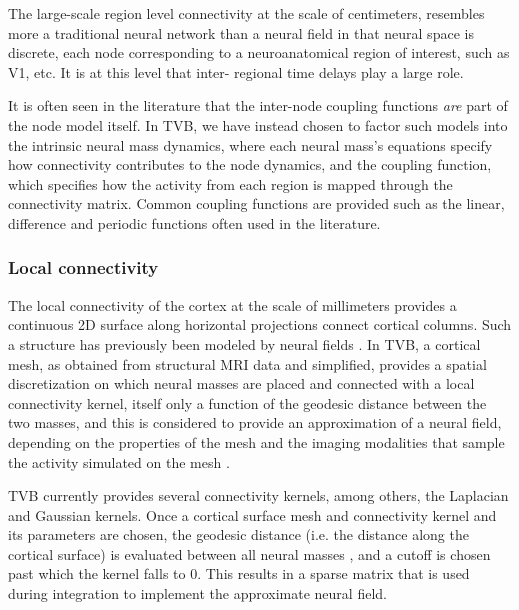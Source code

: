     The large-scale region level connectivity at the scale of centimeters,
    resembles more a traditional neural network than a neural field in that
    neural space is discrete,  each node corresponding to a neuroanatomical
    region of interest, such as V1, etc. It is at this level that inter-
    regional time delays play a large role.

	It is often seen in the literature that the inter-node coupling functions
	\textit{are} part of the node model itself. In TVB, we have instead 
	chosen to factor such models into the intrinsic neural mass dynamics, where each 
	neural mass's equations specify how connectivity contributes to the
	node dynamics, and the coupling function, which specifies how the activity
	from each region is mapped through the connectivity matrix. Common coupling 
	functions are provided such as the linear, difference and periodic functions
	often used in the literature.

	\subsubsection{Local connectivity}

	The local connectivity of the cortex at the scale of millimeters provides
	a continuous 2D surface along horizontal projections connect 
	cortical columns. Such a structure has previously been modeled by
	neural fields \cite{Amari_1977, Jirsa_1997, Liley_1999}. In TVB, a cortical mesh, 
	as obtained from structural MRI data and simplified, provides a spatial 
	discretization on which neural masses are placed and connected with a
	local connectivity kernel, itself only a function of the geodesic distance
	between the two masses, and this is considered to provide an
	approximation of a neural field, depending on the properties
	of the mesh and the imaging modalities that sample the activity simulated
	on the mesh \cite{Spiegler_2013}. 

	TVB currently provides several connectivity kernels, among others, 
	the Laplacian and Gaussian kernels. Once a cortical surface mesh 
	and connectivity kernel and its parameters are chosen, the geodesic
	distance (i.e. the distance along the cortical surface) is evaluated
	between all neural masses \cite{Mitchell1987}, and a cutoff is chosen
	past which the kernel falls to 0. This results in a sparse matrix that 
	is used during integration to implement the approximate neural field. 

